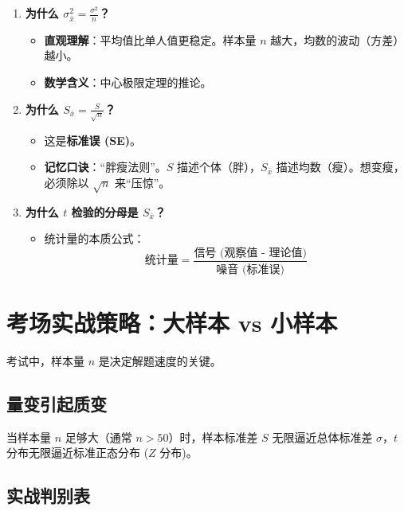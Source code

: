 \documentclass[lang=cn,10pt]{elegantbook}
\begin{document}
\begin{enumerate}
    \item \textbf{为什么 $\sigma_{\bar{x}}^2 = \frac{\sigma^2}{n}$？}
    \begin{itemize}
        \item \textbf{直观理解}：平均值比单人值更稳定。样本量 $n$ 越大，均数的波动（方差）越小。
        \item \textbf{数学含义}：中心极限定理的推论。
    \end{itemize}
    
    \item \textbf{为什么 $S_{\bar{x}} = \frac{S}{\sqrt{n}}$？}
    \begin{itemize}
        \item 这是\textbf{标准误 (SE)}。
        \item \textbf{记忆口诀}：“胖瘦法则”。$S$ 描述个体（胖），$S_{\bar{x}}$ 描述均数（瘦）。想变瘦，必须除以 $\sqrt{n}$ 来“压惊”。
    \end{itemize}

    \item \textbf{为什么 $t$ 检验的分母是 $S_{\bar{x}}$？}
    \begin{itemize}
        \item 统计量的本质公式：
        \[ \text{统计量} = \frac{\text{信号 (观察值 - 理论值)}}{\text{噪音 (标准误)}} \]
    \end{itemize}
\end{enumerate}

\section{考场实战策略：大样本 vs 小样本}

考试中，样本量 $n$ 是决定解题速度的关键。

\subsection{量变引起质变}
当样本量 $n$ 足够大（通常 $n > 50$）时，样本标准差 $S$ 无限逼近总体标准差 $\sigma$，$t$ 分布无限逼近标准正态分布 ($Z$ 分布)。

\subsection{实战判别表}
\end{document}
